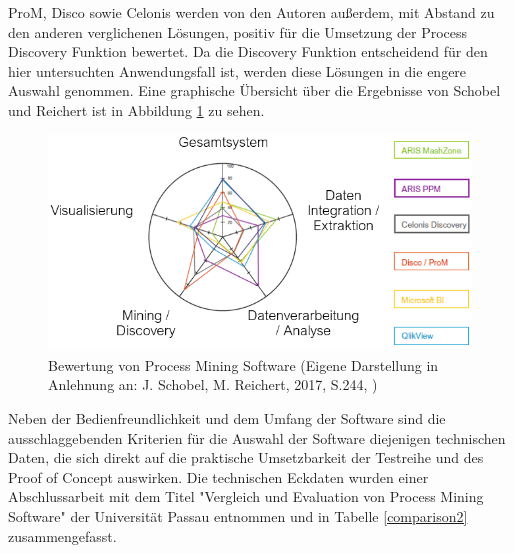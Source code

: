 ProM, Disco sowie Celonis werden von den Autoren außerdem, mit Abstand zu den anderen verglichenen Lösungen, positiv für die Umsetzung der Process Discovery Funktion bewertet. Da die Discovery Funktion entscheidend für den hier untersuchten Anwendungsfall ist, werden diese Lösungen in die engere Auswahl genommen.
Eine graphische Übersicht über die Ergebnisse von Schobel und Reichert ist in Abbildung \ref{fig:toolEval} zu sehen.
\begin{figure}[!ht]
    \centering
    \includegraphics[scale=0.6]{figures/Appbildungen/toolEval.PNG}
    \caption{Bewertung von Process Mining Software (Eigene Darstellung in Anlehnung an: J. Schobel, M. Reichert, 2017, S.244, \cite{Schobel2017})}
    \label{fig:toolEval}
\end{figure}
\newpage
Neben der Bedienfreundlichkeit und dem Umfang der Software sind die ausschlaggebenden Kriterien für die Auswahl der Software diejenigen technischen Daten, die sich direkt auf die praktische Umsetzbarkeit der Testreihe und des Proof of Concept auswirken. Die technischen Eckdaten wurden einer  Abschlussarbeit mit dem Titel "Vergleich und Evaluation von Process Mining Software" der Universität Passau entnommen \cite{compPM} und in Tabelle \ref{comparison2} zusammengefasst.

